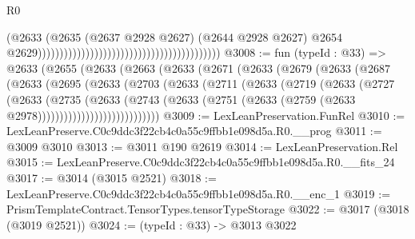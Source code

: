\begin{lexlean}{R0}
\begin{coremodule}
                                                                                    (@2633
                                                                                      (@2635
                                                                                        (@2637
                                                                                          @2928
                                                                                          @2627)
                                                                                        (@2644
                                                                                          @2928
                                                                                          @2627)
                                                                                        @2654
                                                                                        @2629))))))))))))))))))))))))))))))))))))))))))
@3008 := fun (typeId : @33) =>
  @2633
    (@2655
      (@2633
        (@2663
          (@2633
            (@2671
              (@2633
                (@2679
                  (@2633
                    (@2687
                      (@2633
                        (@2695
                          (@2633
                            (@2703
                              (@2633
                                (@2711
                                  (@2633
                                    (@2719
                                      (@2633
                                        (@2727
                                          (@2633
                                            (@2735
                                              (@2633
                                                (@2743
                                                  (@2633
                                                    (@2751
                                                      (@2633
                                                        (@2759
                                                          (@2633 @2978))))))))))))))))))))))))))))
@3009 := LexLeanPreservation.FunRel
@3010 := LexLeanPreserve.C0c9ddc3f22cb4c0a55c9ffbb1e098d5a.R0.__prog
@3011 := @3009 @3010
@3013 := @3011 @190 @2619
@3014 := LexLeanPreservation.Rel
@3015 := LexLeanPreserve.C0c9ddc3f22cb4c0a55c9ffbb1e098d5a.R0.__fits_24
@3017 := @3014 (@3015 @2521)
@3018 := LexLeanPreserve.C0c9ddc3f22cb4c0a55c9ffbb1e098d5a.R0.__enc_1
@3019 := PrismTemplateContract.TensorTypes.tensorTypeStorage
@3022 := @3017 (@3018 (@3019 @2521))
@3024 := (typeId : @33) -> @3013 @3022

\end{coremodule}
\end{lexlean}
